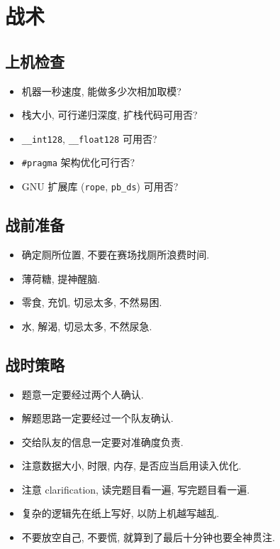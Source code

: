 \section{战术}
\subsection{上机检查}
\begin{itemize}
  \item 机器一秒速度, 能做多少次相加取模?
  \item 栈大小, 可行递归深度, 扩栈代码可用否?
  \item \lstinline{__int128}, \lstinline{__float128} 可用否?
  \item \lstinline{#pragma} 架构优化可行否?
  \item GNU 扩展库 (\lstinline{rope}, \lstinline{pb_ds}) 可用否?
\end{itemize}

\subsection{战前准备}
\begin{itemize}
  \item 确定厕所位置, 不要在赛场找厕所浪费时间.
  \item 薄荷糖, 提神醒脑.
  \item 零食, 充饥, 切忌太多, 不然易困.
  \item 水, 解渴, 切忌太多, 不然尿急.
\end{itemize}

\subsection{战时策略}
\begin{itemize}
  \item 题意一定要经过两个人确认.
  \item 解题思路一定要经过一个队友确认.
  \item 交给队友的信息一定要对准确度负责.
  \item 注意数据大小, 时限, 内存, 是否应当启用读入优化.
  \item 注意 clarification, 读完题目看一遍, 写完题目看一遍.
  \item 复杂的逻辑先在纸上写好, 以防上机越写越乱.
  \item 不要放空自己, 不要慌, 就算到了最后十分钟也要全神贯注.
\end{itemize}
